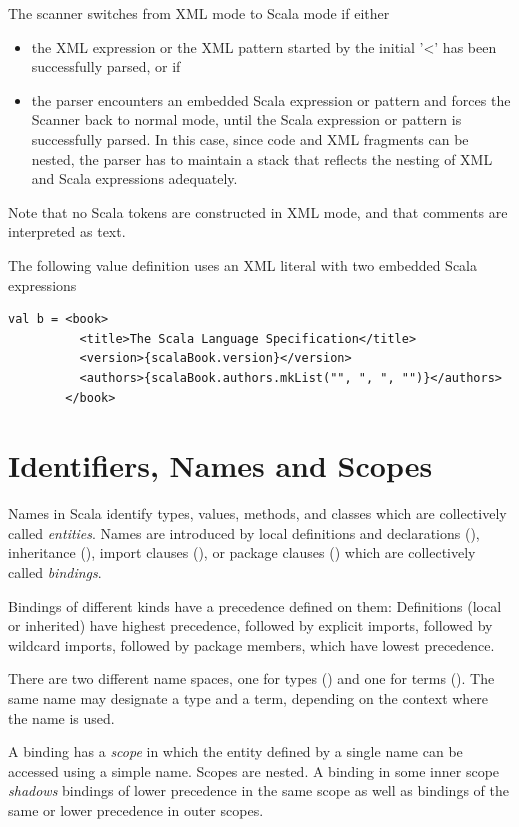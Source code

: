 The scanner switches from XML mode to Scala mode if either
\begin{itemize}
\item the XML expression or the XML pattern started by the initial '<' has been 
successfully parsed, or if

\item the parser encounters an embedded Scala expression or pattern and 
forces the Scanner 
back to normal mode, until the Scala expression or pattern is
successfully parsed. In this case, since code and XML fragments can be
nested, the parser has to maintain a stack that reflects the nesting
of XML and Scala expressions adequately.
\end{itemize}

Note that no Scala tokens are constructed in XML mode, and that comments are interpreted
as text.

\example 
The following value definition uses an XML literal with two embedded
Scala expressions
\begin{lstlisting}
val b = <book>
          <title>The Scala Language Specification</title>
          <version>{scalaBook.version}</version>
          <authors>{scalaBook.authors.mkList("", ", ", "")}</authors>
        </book>
\end{lstlisting}

\chapter{\label{sec:names}Identifiers, Names and Scopes}

Names in Scala identify types, values, methods, and classes which are
collectively called {\em entities}. Names are introduced by local
definitions and declarations (), inheritance (),
import clauses (), or package clauses
() which are collectively called {\em
bindings}.

Bindings of different kinds have a precedence defined on them:
Definitions (local or inherited) have highest precedence, followed by
explicit imports, followed by wildcard imports, followed by package
members, which have lowest precedence.

There are two different name spaces, one for types ()
and one for terms ().  The same name may designate a
type and a term, depending on the context where the name is used.

A binding has a {\em scope} in which the entity defined by a single
name can be accessed using a simple name. Scopes are nested.  A binding
in some inner scope {\em shadows} bindings of lower precedence in the
same scope as well as bindings of the same or lower precedence in outer
scopes. 


